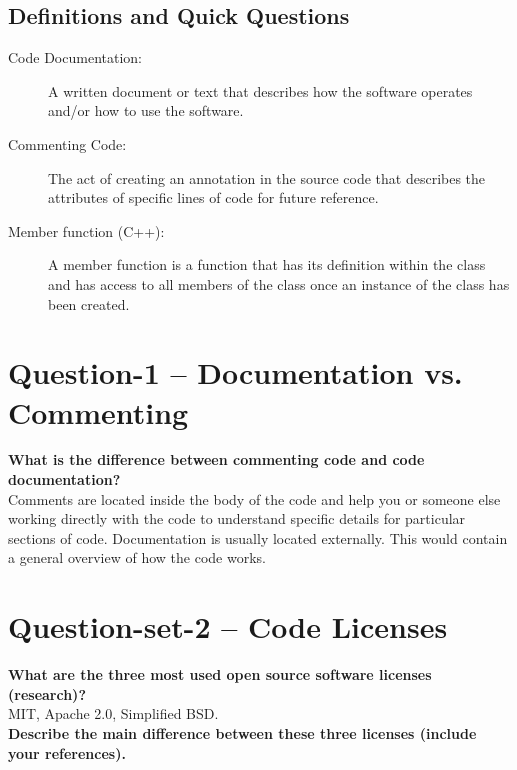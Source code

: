 \documentclass{article}
\begin{document}
\subsection{Definitions and Quick Questions}
\label{definitions}
\begin{description}
\item[Code Documentation:]
A written document or text that describes how the software operates and/or how to use the software.
\item[Commenting Code:]
The act of creating an annotation in the source code that describes the attributes of specific lines of code for future reference.
\item[Member function (C++):]
A member function is a function that has its definition within the class and has access to all members of the class once an instance of the class has been created.
\end{description} 

\section{Question-1 -- Documentation vs. Commenting}
\textbf{What is the difference between commenting code and code documentation?}\\

Comments are located inside the body of the code and help you or someone else working directly with the code to understand specific details for particular sections of code. Documentation is usually located externally. This would contain a general overview of how the code works. \\

\section{Question-set-2 -- Code Licenses}
\textbf{What are the three most used open source software licenses (research)? }\\

MIT, Apache 2.0, Simplified BSD. \\

\textbf{Describe the main difference between these three licenses (include your references).}\\
\end{document}
